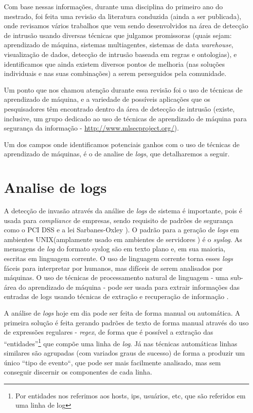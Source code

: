 \documentclass[
	12pt,				%
	openright,			%
	twoside,			%
	a4paper,			%
	english,			%
	spanish,			%
	brazil,				%
	]{abntex2}
\begin{document}
Com base nessas informações, durante uma disciplina do primeiro ano do mestrado, foi feita uma revisão da literatura conduzida (ainda a ser publicada), onde revisamos vários trabalhos que vem sendo desenvolvidos na área de detecção de intrusão usando diversas técnicas que julgamos promissoras (quais sejam: aprendizado de máquina, sistemas multiagentes, sistemas de data \emph{warehouse}, visualização de dados, detecção de intrusão baseada em regras e ontologias), e identificamos que ainda existem diversos pontos de melhoria (nas soluções individuais e nas suas combinações) a serem perseguidos pela comunidade.

Um ponto que nos chamou atenção durante essa revisão foi o uso de técnicas de aprendizado de máquina, e a variedade de possíveis aplicações que os pesquisadores têm encontrado dentro da área de detecção de intrusão (existe, inclusive, um grupo dedicado ao uso de técnicas de aprendizado de máquina para segurança da informação - \url{http://www.mlsecproject.org/}). 

Um dos campos onde identificamos potenciais ganhos com o uso de técnicas de aprendizado de máquinas, é o de analise de \emph{logs}, que detalharemos a seguir.

\section{Analise de logs}

A detecção de invasão através da análise de \emph{logs} de sistema é importante, pois é usada para \emph{compliance} de empresas, sendo requisito de padrões de segurança como o PCI DSS e a lei Sarbanes-Oxley \cite{prakhar2012log}). O padrão para a geração de \emph{logs} em ambientes UNIX\texttrademark (amplamente usado em ambientes de servidores \cite{w3techs-osusage}) é o \emph{syslog}. As mensagens de \emph{log} do formato syslog são em texto plano e, em sua maioria, escritas em linguagem corrente. O uso de linguagem corrente torna esses \emph{logs} fáceis para interpretar por humanos, mas difíceis de serem analisados por máquinas. O uso de técnicas de processamento natural de linguagem - uma sub-área do aprendizado de máquina - pode ser usada para extrair informações das entradas de logs usando técnicas de extração e recuperação de informação \cite{bird2009natural,manning2008introduction}.

A análise de \emph{logs} hoje em dia pode ser feita de forma manual ou automática. A primeira solução é feita gerando padrões de texto de forma manual através do uso de expressões regulares - \emph{regex}, de forma que é possível a extração das ``entidades''\footnote{Por entidades nos referimos aos hosts, ips, usuários, etc, que são referidos em uma linha de log} que compõe uma linha de \emph{log}. Já nas técnicas automáticas linhas similares são agrupadas  (com variados graus de sucesso) de forma a produzir um único ``tipo de evento``, que pode ser mais facilmente analisado, mas sem conseguir discernir os componentes de cada linha.
\end{document}
